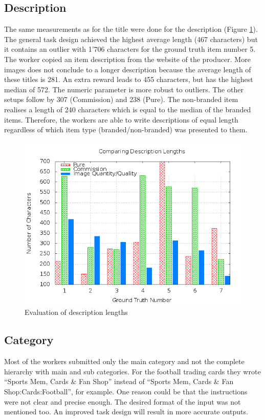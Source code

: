 \subsection{Description}
The same measurements as for the title were done for the description (Figure \ref{crowdsourcing_desc_length}). The general task design achieved the highest average length (467 characters) but it contains an outlier with 1'706 characters for the ground truth item number 5. The worker copied an item description from the website of the producer. More images does not conclude to a longer description because the average length of these titles is 281. An extra reward leads to 455 characters, but has the highest median of 572. The numeric parameter is more robust to outliers. The other setups follow by 307 (Commission) and 238 (Pure). The non-branded item realises a length of 240 characters which is equal to the median of the branded items. Therefore, the workers are able to write descriptions of equal length regardless of which item type (branded/non-branded) was presented to them.
\begin{figure}
\centering
\includegraphics[scale=0.55]{images/plots/crowdsourcing/plot_description_length.png}
\caption{Evaluation of description lengths}
\label{crowdsourcing_desc_length}
\end{figure}

\subsection{Category}
Most of the workers submitted only the main category and not the complete hierarchy with main and sub categories. For the football trading cards they wrote ``Sports Mem, Cards \& Fan Shop'' instead of ``Sports Mem, Cards \& Fan Shop:Cards:Football'', for example. One reason could be that the instructions were not clear and precise enough. The desired format of the input was not mentioned too. An improved task design will result in more accurate outputs.
